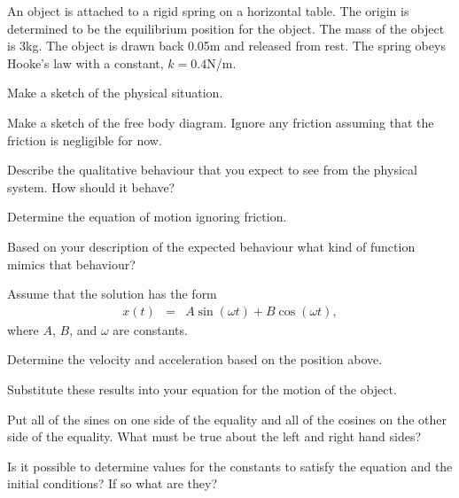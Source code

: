 \begin{problem}
\item An object is attached to a rigid spring on a horizontal
  table. The origin is determined to be the equilibrium position for
  the object. The mass of the object is 3kg. The object is drawn back
  0.05m and released from rest. The spring obeys Hooke's law with a
  constant, $k=0.4$N/m.
  \begin{subproblem}
    \item Make a sketch of the physical situation.
      \vfill
    \item Make a sketch of the free body diagram. Ignore any friction
      assuming that the friction is negligible for now.
      \vfill
    \item Describe the qualitative behaviour that you expect to see
      from the physical system. How should it behave?
      \vfill
    \item Determine the equation of motion ignoring friction.
      \vfill

    \item Based on your description of the expected behaviour what
      kind of function mimics that behaviour?
      \vspace{3em}

      \clearpage

    \item Assume that the solution has the form
      \begin{eqnarray*}
        x(t) & = & A \sin(\omega t) + B \cos(\omega t),
      \end{eqnarray*}
      where $A$, $B$, and $\omega$ are constants. 
      \begin{subproblem}
      \item Determine the velocity and acceleration based on the
        position above.  
        \vfill
      \item Substitute these results into your equation for the motion
        of the object.
        \vfill
        \clearpage
      \item Put all of the sines on one side of the equality and all
        of the cosines on the other side of the equality. What must be
        true about the left and right hand sides?
        \vspace{6em}
      \item Is it possible to determine values for the constants to
        satisfy the equation and the initial conditions? If so what
        are they?
        \vfill
      \end{subproblem}

  \end{subproblem}
\end{problem}

